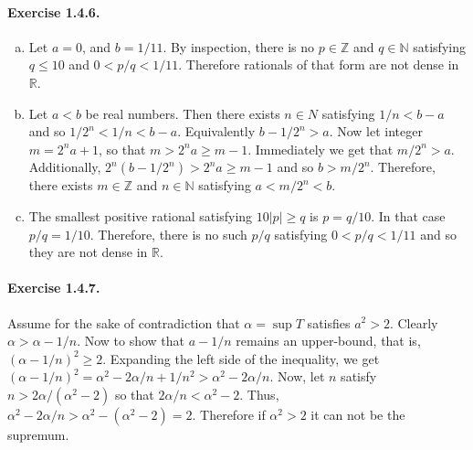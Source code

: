 \documentclass{article}
\newcommand{\N}{\mathbb{N}}
\newcommand{\R}{\mathbb{R}}
\newcommand{\Z}{\mathbb{Z}}
\begin{document}
\paragraph{Exercise 1.4.6.}
\begin{enumerate}[(a)]
    \item Let $a=0$, and $b=1/11$. By inspection, there is no $p\in \Z$ and $q\in \N$ satisfying $q \leq 10$ and $0<p/q<1/11$. Therefore rationals of that form are not dense in $\R$.
    \item Let $a<b$ be real numbers. Then there exists $n \in N$ satisfying $1/n < b-a$ and so $1/2^n < 1/n < b-a$. Equivalently $b-1/2^n > a$. Now let integer $m = 2^na+ 1$, so that $m>2^na\geq m-1$. Immediately we get that $m/2^n>a$. Additionally, $2^n(b-1/2^n) > 2^na \geq m-1$ and so $b>m/2^n$. Therefore, there exists $m\in \Z$ and $n\in \N$ satisfying $a<m/2^n<b$.
    \item The smallest positive rational satisfying $10|p|\geq q$ is $p=q/10$. In that case $p/q=1/10$. Therefore, there is no such $p/q$ satisfying $0<p/q<1/11$ and so they are not dense in $\R$.
\end{enumerate}

\paragraph{Exercise 1.4.7.}
Assume for the sake of contradiction that $\alpha= \sup T$ satisfies $a^2>2$. Clearly $\alpha > \alpha - 1/n$. Now to show that $a-1/n$ remains an upper-bound, that is, $(\alpha-1/n)^2 \geq 2$. Expanding the left side of the inequality, we get $(\alpha-1/n)^2 = \alpha^2 - 2\alpha /n + 1/n^2 > \alpha^2 - 2\alpha/n$. Now, let $n$ satisfy $n > 2\alpha / (\alpha^2 - 2)$ so that $2\alpha /n < \alpha^2 -2$. Thus, $\alpha^2 - 2\alpha /n > \alpha^2 - (\alpha^2 -2) = 2$. Therefore if $\alpha^2 > 2$ it can not be the supremum.
\end{document}
